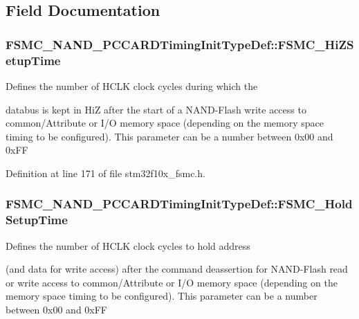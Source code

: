 \subsection{Field Documentation}
\hypertarget{struct_f_s_m_c___n_a_n_d___p_c_c_a_r_d_timing_init_type_def_a8a2a2a9e71dbf276fddad2bb32c0d256}{
\subsubsection[{F\-S\-M\-C\-\_\-\-Hi\-Z\-Setup\-Time}]{ F\-S\-M\-C\-\_\-\-N\-A\-N\-D\-\_\-\-P\-C\-C\-A\-R\-D\-Timing\-Init\-Type\-Def\-::\-F\-S\-M\-C\-\_\-\-Hi\-Z\-Setup\-Time}}\label{struct_f_s_m_c___n_a_n_d___p_c_c_a_r_d_timing_init_type_def_a8a2a2a9e71dbf276fddad2bb32c0d256}
\begin{DoxyVerb}   Defines the number of HCLK clock cycles during which the
\end{DoxyVerb}
 databus is kept in Hi\-Z after the start of a N\-A\-N\-D-\/\-Flash write access to common/\-Attribute or I/\-O memory space (depending on the memory space timing to be configured). This parameter can be a number between 0x00 and 0x\-F\-F 

Definition at line 171 of file stm32f10x\-\_\-fsmc.\-h.

\hypertarget{struct_f_s_m_c___n_a_n_d___p_c_c_a_r_d_timing_init_type_def_ae2b53c2cfd55ff277f453613dcf7c8b2}{
\subsubsection[{F\-S\-M\-C\-\_\-\-Hold\-Setup\-Time}]{ F\-S\-M\-C\-\_\-\-N\-A\-N\-D\-\_\-\-P\-C\-C\-A\-R\-D\-Timing\-Init\-Type\-Def\-::\-F\-S\-M\-C\-\_\-\-Hold\-Setup\-Time}}\label{struct_f_s_m_c___n_a_n_d___p_c_c_a_r_d_timing_init_type_def_ae2b53c2cfd55ff277f453613dcf7c8b2}
\begin{DoxyVerb}  Defines the number of HCLK clock cycles to hold address
\end{DoxyVerb}
 (and data for write access) after the command deassertion for N\-A\-N\-D-\/\-Flash read or write access to common/\-Attribute or I/\-O memory space (depending on the memory space timing to be configured). This parameter can be a number between 0x00 and 0x\-F\-F 

